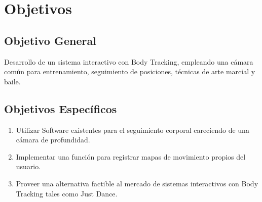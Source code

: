 \chapter{Objetivos}


\section{Objetivo General}

Desarrollo de un sistema interactivo con Body Tracking, empleando una cámara común para entrenamiento, seguimiento de posiciones, técnicas de arte marcial y baile.
\section{Objetivos Específicos}

\begin{enumerate}
	\item Utilizar Software existentes para el seguimiento corporal careciendo de una cámara de profundidad.
	\item Implementar una función para registrar mapas de movimiento propios del usuario.
	\item Proveer una alternativa factible al mercado de sistemas interactivos con Body Tracking tales como Just Dance.
\end{enumerate}

